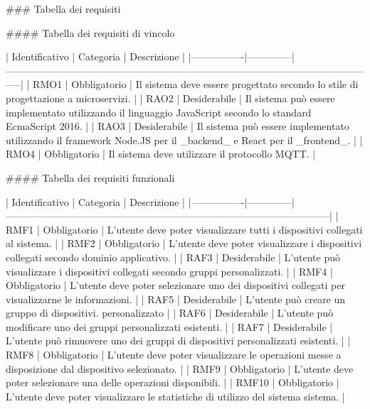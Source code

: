 ### Tabella dei requisiti

#### Tabella dei requisiti di vincolo

| Identificativo | Categoria    | Descrizione                                                                                                     |
|----------------|--------------|-----------------------------------------------------------------------------------------------------------------|
| RMO1           | Obbligatorio | Il sistema deve essere progettato secondo lo stile di progettazione a microservizi.                             |
| RAO2           | Desiderabile | Il sistema può essere implementato utilizzando il linguaggio JavaScript secondo lo standard EcmaScript 2016.    |
| RAO3           | Desiderabile | Il sistema può essere implementato utilizzando il framework Node.JS per il _backend_ e React per il _frontend_. |
| RMO4           | Obbligatorio | Il sistema deve utilizzare il protocollo MQTT.                                                                  |

#### Tabella dei requisiti funzionali

| Identificativo | Categoria    | Descrizione                                                                                      |
|----------------|--------------|--------------------------------------------------------------------------------------------------|
| RMF1           | Obbligatorio | L'utente deve poter visualizzare tutti i dispositivi collegati al sistema.                       |
| RMF2           | Obbligatorio | L'utente deve poter visualizzare i dispositivi collegati secondo dominio applicativo.            |
| RAF3           | Desiderabile | L'utente può visualizzare i dispositivi collegati secondo gruppi personalizzati.                 |
| RMF4           | Obbligatorio | L'utente deve poter selezionare uno dei dispositivi collegati per visualizzarne le informazioni. |
| RAF5           | Desiderabile | L'utente può creare un gruppo di dispositivi. personalizzato                                     |
| RAF6           | Desiderabile | L'utente può modificare uno dei gruppi personalizzati esistenti.                                 |
| RAF7           | Desiderabile | L'utente può rimuovere uno dei gruppi di dispositivi personalizzati esistenti.                   |
| RMF8           | Obbligatorio | L'utente deve poter visualizzare le operazioni messe a disposizione dal dispositivo selezionato. |
| RMF9           | Obbligatorio | L'utente deve poter selezionare una delle operazioni disponibili.                                |
| RMF10          | Obbligatorio | L'utente deve poter visualizzare le statistiche di utilizzo del sistema sistema.                 |

